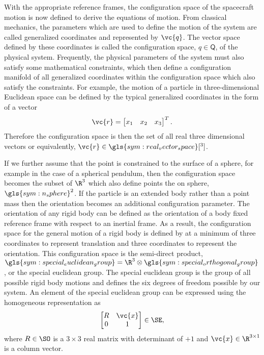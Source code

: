 With the appropriate reference frames, the configuration space of the spacecraft motion is now defined to derive the equations of motion.
From classical mechanics, the parameters which are used to define the motion of the system are called generalized coordinates and represented by \( \vc{q} \).
The vector space defined by these coordinates is called the configuration space, \( q \in \mathsf{Q} \), of the physical system.
Frequently, the physical parameters of the system must also satisfy some mathematical constraints, which then define a configuration manifold of all generalized coordinates within the configuration space which also satisfy the constraints.
For example, the motion of a particle in three-dimensional Euclidean space can be defined by the typical generalized coordinates in the form of a vector
\begin{align*}
    \vc{r} = \begin{bmatrix}
        x_1 & x_2 & x_3
    \end{bmatrix}^T.
\end{align*}
Therefore the configuration space is then the set of all real three dimensional vectors or equivalently, \(\vc{r} \in \gls{sym:real_vector_space}[^3]\).

If we further assume that the point is constrained to the surface of a sphere, for example in the case of a spherical pendulum, then the configuration space becomes the subset of \( \R^3 \) which also define points the on sphere, \( \gls{sym:n_sphere}^2 \).
If the particle is an extended body rather than a point mass then the orientation becomes an additional configuration parameter.
The orientation of any rigid body can be defined as the orientation of a body fixed reference frame with respect to an inertial frame. 
As a result, the configuration space for the general motion of a rigid body is defined by at a minimum of three coordinates to represent translation and three coordinates to represent the orientation.
This configuration space is the semi-direct product, \( \gls{sym:special_euclidean_group} = \R^3 \otimes \gls{sym:special_orthogonal_group} \), or the special euclidean group.
The special euclidean group is the group of all possible rigid body motions and defines the six degrees of freedom possible by our system.
An element of the special euclidean group can be expressed using the homogeneous representation as
\begin{align*}
    \begin{bmatrix}
        R & \vc{x} \\
        0 & 1
    \end{bmatrix} \in \SE,
\end{align*}
where \( R \in \SO\) is a \( 3 \times 3 \) real matrix with determinant of \( +1\) and \( \vc{x} \in \R^{3 \times 1}\) is a column vector.

